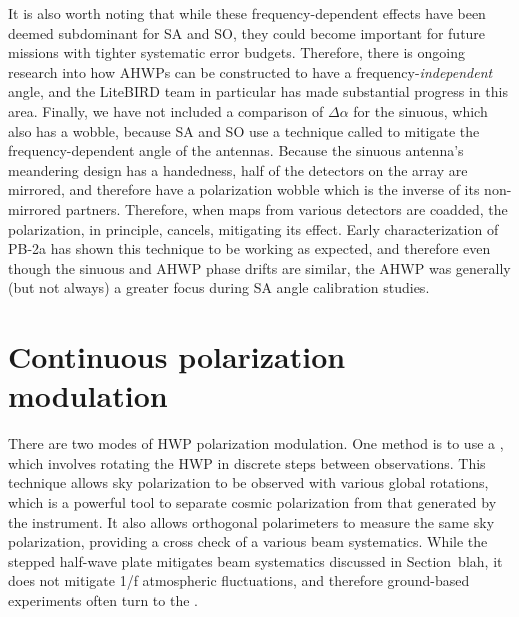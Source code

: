 It is also worth noting that while these frequency-dependent effects have been deemed subdominant for SA and SO, they could become important for future missions with tighter systematic error budgets. Therefore, there is ongoing research into how AHWPs can be constructed to have a frequency-\textit{independent} angle, and the LiteBIRD team in particular has made substantial progress in this area. Finally, we have not included a comparison of $\Delta \alpha$ for the sinuous, which also has a wobble, because SA and SO use a technique called  to mitigate the frequency-dependent angle of the antennas. Because the sinuous antenna's meandering design has a handedness, half of the detectors on the array are mirrored, and therefore have a polarization wobble which is the inverse of its non-mirrored partners. Therefore, when maps from various detectors are coadded, the polarization, in principle, cancels, mitigating its effect. Early characterization of PB-2a has shown this technique to be working as expected, and therefore even though the sinuous and AHWP phase drifts are similar, the AHWP was generally (but not always) a greater focus during SA angle calibration studies.


\section{Continuous polarization modulation}
\label{sec:continuous_polarization_modulation}

There are two modes of HWP polarization modulation. One method is to use a , which involves rotating the HWP in discrete steps between observations. This technique allows sky polarization to be observed with various global rotations, which is a powerful tool to separate cosmic polarization from that generated by the instrument. It also allows orthogonal polarimeters to measure the same sky polarization, providing a cross check of a various beam systematics. While the stepped half-wave plate mitigates beam systematics discussed in Section~blah, it does not mitigate 1/f atmospheric fluctuations, and therefore ground-based experiments often turn to the .

